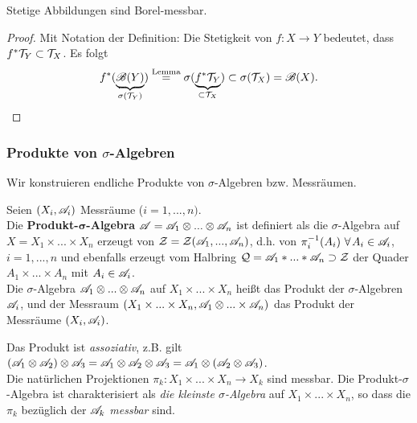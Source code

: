 \begin{lemma}
\begin{mdframed}
Stetige Abbildungen sind Borel-messbar.
\end{mdframed}
\begin{proof}
Mit Notation der Definition: Die Stetigkeit von $f:X \longrightarrow Y$ bedeutet, dass $f^* \TT_Y \subset \TT_X$. Es folgt
$$
f^*(\underbrace{\BB(Y)}_{\sigma(\TT_Y)}) \overset{\text{Lemma}}= \sigma(\underbrace{f^*\TT_Y}_{\subset \TT_X}) \subset \sigma(\TT_X) = \BB(X).
$$
\end{proof}
\end{lemma}

\subsubsection{Produkte von $\sigma$-Algebren}
Wir konstruieren endliche Produkte von $\sigma$-Algebren bzw. Messräumen. 
\begin{definition}
\begin{mdframed}
Seien $(X_i, \AA_i)$ Messräume ($i=1,...,n)$. \vspace{0.5pc} \\
Die \textbf{Produkt-$\boldsymbol\sigma$-Algebra} $\AA = \AA_1 \otimes ... \otimes \AA_n$ ist definiert als die $\sigma$-Algebra auf $X = X_1 \times ... \times X_n$ erzeugt von $\ZZ = \ZZ(\AA_1, ..., \AA_n)$, d.h. von $\pi_i^{-1}(A_i) \ \forall A_i \in \AA_i$, $i=1,...,n$ und ebenfalls erzeugt vom Halbring $\QQ = \AA_1 \ast ... \ast \AA_n \supset \ZZ$ der Quader $A_1 \times ... \times A_n$ mit $A_i \in \AA_i$. 
\vspace{0.5pc}\\
Die $\sigma$-Algebra $\AA_1 \otimes ... \otimes \AA_n$ auf $X_1 \times ... \times X_n$ heißt das Produkt der $\sigma$-Algebren $\AA_i$, und der Messraum $(X_1\times ... \times X_n, \AA_1 \otimes ... \times \AA_n)$ das Produkt der Messräume $(X_i,\AA_i)$.
\end{mdframed}
\end{definition}
Das Produkt ist \emph{assoziativ}, z.B. gilt $(\AA_1 \otimes \AA_2) \otimes \AA_3 = \AA_1 \otimes \AA_2 \otimes \AA_3 = \AA_1 \otimes (\AA_2 \otimes \AA_3)$.\Ueb 
\vspace{0.5pc}\\
Die natürlichen Projektionen $\pi_k:X_1 \times ... \times X_n \longrightarrow X_k$ sind messbar. Die Produkt-$\sigma$-Algebra ist charakterisiert als \emph{die kleinste $\sigma$-Algebra} auf $X_1 \times ... \times X_n$, so dass die $\pi_k$ bezüglich der $\AA_k$ \emph{messbar} sind. 
